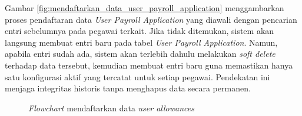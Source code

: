 Gambar \ref{fig:mendaftarkan_data_user_payroll_application} menggambarkan proses pendaftaran data \textit{User Payroll Application} yang diawali dengan pencarian entri sebelumnya pada pegawai terkait. Jika tidak ditemukan, sistem akan langsung membuat entri baru pada tabel \textit{User Payroll Application}. Namun, apabila entri sudah ada, sistem akan terlebih dahulu melakukan \textit{soft delete} terhadap data tersebut, kemudian membuat entri baru guna memastikan hanya satu konfigurasi aktif yang tercatat untuk setiap pegawai. Pendekatan ini menjaga integritas historis tanpa menghapus data secara permanen.


\begin{figure}[H]
    \centering
    \caption{\textit{Flowchart} mendaftarkan data \textit{user allowances}}
    \label{fig:mendaftarkan_data_user_allowances}
\end{figure}

